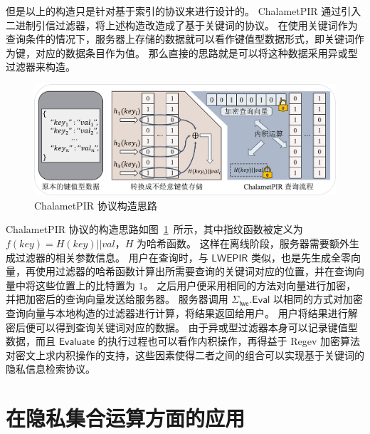 但是以上的构造只是针对基于索引的协议来进行设计的。
ChalametPIR 通过引入二进制引信过滤器，将上述构造改造成了基于关键词的协议。
在使用关键词作为查询条件的情况下，服务器上存储的数据就可以看作键值型数据形式，即关键词作为键，对应的数据条目作为值。
那么直接的思路就是可以将这种数据采用异或型过滤器来构造。
\begin{figure}[ht]
  \centering
  \includegraphics[width=\textwidth]{figures/pir_exp.pdf}
  \caption{ChalametPIR 协议构造思路}
  \label{fig:pir_exp}
\end{figure}
ChalametPIR 协议的构造思路如图~\ref{fig:pir_exp}~所示，其中指纹函数被定义为 $f(key) = H(key) || val$，$H$ 为哈希函数。
这样在离线阶段，服务器需要额外生成过滤器的相关参数信息。
用户在查询时，与 $\mathsf{LWEPIR}$ 类似，也是先生成全零向量，再使用过滤器的哈希函数计算出所需要查询的关键词对应的位置，并在查询向量中将这些位置上的比特置为 $1$。
之后用户便采用相同的方法对向量进行加密，并把加密后的查询向量发送给服务器。
服务器调用 $\Sigma_{\mathsf{lwe}}.\mathsf{Eval}$ 以相同的方式对加密查询向量与本地构造的过滤器进行计算，将结果返回给用户。
用户将结果进行解密后便可以得到查询关键词对应的数据。
由于异或型过滤器本身可以记录键值型数据，而且 $\mathsf{Evaluate}$ 的执行过程也可以看作内积操作，再得益于 Regev 加密算法对密文上求内积操作的支持，这些因素使得二者之间的组合可以实现基于关键词的隐私信息检索协议。


\section{在隐私集合运算方面的应用}

